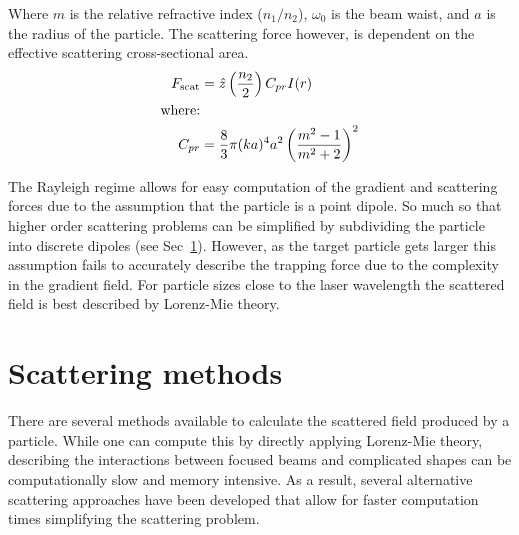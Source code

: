 Where $m$ is the relative refractive index ($n_1/n_2$), $\omega_0$ is 
the beam waist, and $a$ is the radius of the particle. The scattering force 
however, is dependent on the effective scattering cross-sectional area. 
\begin{align}
  F_{\rm scat}
  &= \hat{z} \left(\frac{n_2}{2}\right) C_{pr} I(r) \\
  \text{where:} \nonumber \\
  C_{pr} &= \frac{8}{3} \pi (ka)^4 a^2 \left(\frac{m^2-1}{m^2+2}\right)^2
\end{align}

The Rayleigh regime allows for easy computation of the gradient and 
scattering forces due to the assumption that the particle is a point 
dipole. So much so that higher order scattering problems can be 
simplified by subdividing the particle into discrete dipoles (see 
Sec~\ref{sec:scattering}). However, as the target particle gets larger 
this assumption fails to accurately describe the trapping force due 
to the complexity in the gradient field. For particle sizes close to 
the laser wavelength the scattered field is best described by Lorenz-Mie 
theory. 


\section{Scattering methods}
\label{sec:scattering}
There are several methods available to calculate the scattered field 
produced by a particle. While one can compute this by directly applying
Lorenz-Mie theory, describing the interactions between focused beams and 
complicated shapes can be computationally slow and memory intensive. As a
result, several alternative scattering approaches have been developed that
allow for faster computation times simplifying the scattering problem.
